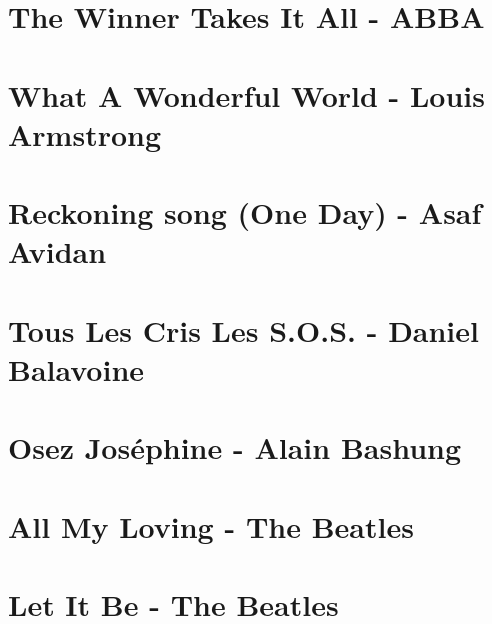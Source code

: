 \documentclass{guitartabs}
\begin{document}
\linespread{0.3}
\tableofcontents
\newpage

\linespread{1}

\section{The Winner Takes It All - ABBA}
\begin{guitar}

\end{guitar}

\section*{What A Wonderful World - Louis Armstrong}
\begin{guitar}

\end{guitar}



\section{Reckoning song (One Day) - Asaf Avidan}
\begin{guitar}

\end{guitar}


\section{Tous Les Cris Les S.O.S. - Daniel Balavoine}
\begin{guitar}

\end{guitar}

\section{Osez Joséphine - Alain Bashung}
\begin{guitar}

\end{guitar}

\section*{All My Loving - The Beatles}
\begin{guitar}

\end{guitar}

\section*{Let It Be - The Beatles}
\begin{guitar}

\end{guitar}
\end{document}
